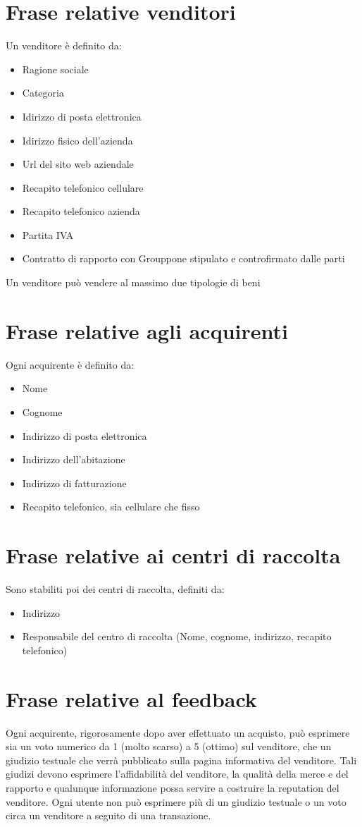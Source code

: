 \documentclass[a4paper, 10pt]{report}
\begin{document}
\section{Frase relative venditori}
Un venditore \`e definito da:
\begin{itemize}
\item Ragione sociale
\item Categoria
\item Idirizzo di posta elettronica
\item Idirizzo fisico dell'azienda
\item Url del sito web aziendale
\item Recapito telefonico cellulare
\item Recapito telefonico azienda
\item Partita IVA
\item Contratto di rapporto con Grouppone stipulato e controfirmato dalle parti
\end{itemize}
Un venditore pu\`o vendere al massimo due tipologie di beni
\section{Frase relative agli acquirenti}
Ogni acquirente \`e definito da:
\begin{itemize}
\item Nome
\item Cognome
\item Indirizzo di posta elettronica
\item Indirizzo dell'abitazione
\item Indirizzo di fatturazione
\item Recapito telefonico, sia cellulare che fisso
\end{itemize}

\section{Frase relative ai centri di raccolta}
Sono stabiliti poi dei centri di raccolta, definiti da:
\begin{itemize}
\item Indirizzo
\item Responsabile del centro di raccolta (Nome, cognome, indirizzo, recapito telefonico)
\end{itemize}

\section{Frase relative al feedback}
Ogni acquirente, rigorosamente dopo aver effettuato un acquisto, pu\`o esprimere sia un voto numerico da 1 (molto scarso) a 5 (ottimo) sul venditore, che un giudizio testuale che verr\`a pubblicato sulla pagina informativa del venditore. Tali giudizi devono esprimere l'affidabilit\`a del venditore, la qualit\`a della merce e del rapporto e qualunque informazione possa servire a costruire la reputation del venditore. Ogni utente non può esprimere più di un giudizio testuale o un voto circa un venditore a seguito di una transazione.
\end{document}
